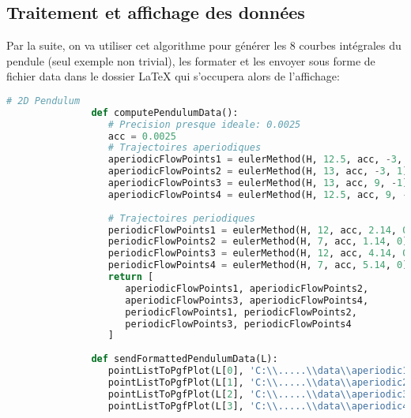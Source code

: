    \subsection{Traitement et affichage des données}
      Par la suite, on va utiliser cet algorithme pour générer les 8 courbes intégrales du pendule (seul exemple non trivial), les formater et les envoyer sous forme de fichier data dans le dossier LaTeX qui s'occupera alors de l'affichage:
      \begin{center}
         \begin{lstlisting}[language=Python, caption=Méthode d'Euler générale]
               # 2D Pendulum
               def computePendulumData():
                  # Precision presque ideale: 0.0025
                  acc = 0.0025
                  # Trajectoires aperiodiques
                  aperiodicFlowPoints1 = eulerMethod(H, 12.5, acc, -3, 2) # Longueur d'arc 12.5
                  aperiodicFlowPoints2 = eulerMethod(H, 13, acc, -3, 1) # Longueur d'arc 13
                  aperiodicFlowPoints3 = eulerMethod(H, 13, acc, 9, -1) # Longueur d'arc 13
                  aperiodicFlowPoints4 = eulerMethod(H, 12.5, acc, 9, -2) # Longueur d'arc 12.5
               
                  # Trajectoires periodiques
                  periodicFlowPoints1 = eulerMethod(H, 12, acc, 2.14, 0) # Longueur d'arc 12
                  periodicFlowPoints2 = eulerMethod(H, 7, acc, 1.14, 0) # Longueur d'arc 7
                  periodicFlowPoints3 = eulerMethod(H, 12, acc, 4.14, 0) # Longueur d'arc 12
                  periodicFlowPoints4 = eulerMethod(H, 7, acc, 5.14, 0) # Longueur d'arc 7
                  return [
                     aperiodicFlowPoints1, aperiodicFlowPoints2, 
                     aperiodicFlowPoints3, aperiodicFlowPoints4, 
                     periodicFlowPoints1, periodicFlowPoints2, 
                     periodicFlowPoints3, periodicFlowPoints4
                  ]
               
               def sendFormattedPendulumData(L):
                  pointListToPgfPlot(L[0], 'C:\\.....\\data\\aperiodic1.dat')
                  pointListToPgfPlot(L[1], 'C:\\.....\\data\\aperiodic2.dat')
                  pointListToPgfPlot(L[2], 'C:\\.....\\data\\aperiodic3.dat')
                  pointListToPgfPlot(L[3], 'C:\\.....\\data\\aperiodic4.dat')
               

\end{lstlisting}
\end{center}
